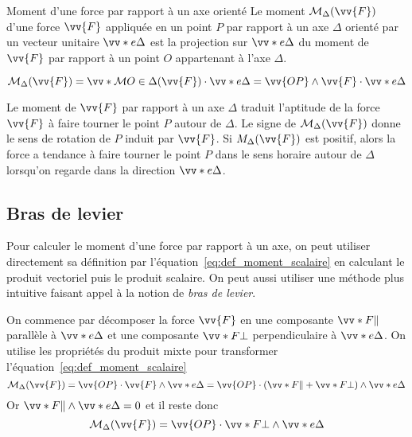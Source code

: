 \documentclass{cours}
\begin{document}
\begin{loi}{Moment d'une force par rapport à un axe orienté}
Le moment $\M_\Delta(\vv{F})$ d'une force $\vv{F}$ appliquée en un point $P$ par rapport à un axe $\Delta$ orienté par un vecteur unitaire $\vv*{e}{\Delta}$  est la projection sur $\vv*{e}{\Delta}$ du moment de $\vv{F}$ par rapport à un point $O$ appartenant à l'axe $\Delta$. 
  
\begin{equation}
  \M_\Delta(\vv{F}) = \vv*{\M}{O\in\Delta}(\vv{F})\cdot \vv*{e}{\Delta} = \vv{OP}\wedge\vv{F}\cdot\vv*{e}{\Delta}
  \label{eq:def_moment_scalaire}
\end{equation}
\end{loi}

Le moment de $\vv{F}$ par rapport à un axe $\Delta$ traduit l'aptitude de la force $\vv{F}$ à faire tourner le point $P$ autour de $\Delta$. Le signe de $\M_\Delta(\vv{F})$ donne le sens de rotation de $P$ induit par $\vv{F}$. Si $M_\Delta(\vv{F})$ est positif, alors la force a tendance à faire tourner le point $P$ dans le sens horaire autour de $\Delta$ lorsqu'on regarde dans la direction $\vv*{e}{\Delta}$.    

\subsection{Bras de levier}%
\label{sub:bras_de_levier}
Pour calculer le moment d'une force par rapport à un axe, on peut utiliser directement sa définition par l'équation~\eqref{eq:def_moment_scalaire} en calculant le produit vectoriel puis le produit scalaire. On peut aussi utiliser une méthode plus intuitive faisant appel à la notion de \emph{bras de levier}.

\newcommand{\Fp}{\vv*{F}{\parallel}}
\newcommand{\Fo}{\vv*{F}{\perp}}
On commence par décomposer la force $\vv{F}$ en une composante $\Fp$ parallèle à $\vv*{e}{\Delta}$ et une composante $\Fo$ perpendiculaire à $\vv*{e}{\Delta}$. On utilise les propriétés du produit mixte pour transformer l'équation~\eqref{eq:def_moment_scalaire}  
\begin{equation}
  \M_\Delta(\vv{F}) = \vv{OP}\cdot\vv{F}\wedge\vv*{e}{\Delta} = \vv{OP}\cdot(\Fp+\Fo)\wedge\vv*{e}{\Delta}
\end{equation}
%
Or $\Fp\wedge\vv*{e}{\Delta}=0$ et il reste donc
\begin{equation}
  \M_\Delta(\vv{F}) = \vv{OP}\cdot\Fo\wedge\vv*{e}{\Delta}
\end{equation}
\end{document}
